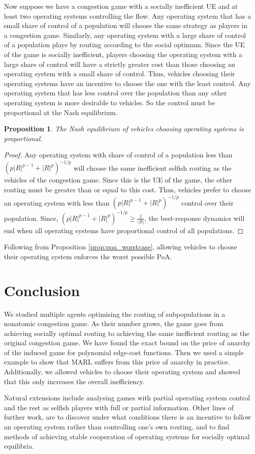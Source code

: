 \documentclass{article}
\newtheorem{prop}{Proposition}
\begin{document}
    Now suppose we have a congestion game with a socially inefficient UE and at least two operating systems controlling the flow. Any operating system that has a small share of control of a population will choose the same strategy as players in a congestion game. Similarly, any operating system with a large share of control of a population plays by routing according to the social optimum. Since the UE of the game is socially inefficient, players choosing the operating system with a large share of control will have a strictly greater cost than those choosing an operating system with a small share of control. Thus, vehicles choosing their operating systems have an incentive to choose the one with the least control. 
    Any operating system that has less control over the population than any other operating system is more desirable to vehicles. So the control must be proportional at the Nash equilibrium.
    \begin{prop}
    The Nash equilibrium of vehicles choosing operating systems is proportional. 
    \end{prop}
    \begin{proof} 
    Any operating system with share of control of a population less than $(p|R|^{p-1}+|R|^p)^{-1/p}$ will choose the same inefficient selfish routing as the vehicles of the congestion game. Since this is the UE of the game, the other routing must be greater than or equal to this cost. Thus, vehicles prefer to choose an operating system with less than $(p|R|^{p-1}+|R|^p)^{-1/p}$ control over their population.  Since, $(p|R|^{p-1}+|R|^p)^{-1/p}\geq \frac{1}{|R|}$, the best-response dynamics will end when all operating systems have proportional control of all populations.
    \end{proof}
    
    Following from Proposition \ref{prop:poa_worstcase}, allowing vehicles to choose their operating system enforces the worst possible PoA. %
    

\section{Conclusion}
  We studied multiple agents optimising the routing of subpopulations in a nonatomic congestion game. As their number grows, the game goes from achieving socially optimal routing to achieving the same inefficient routing as the original congestion game. We have found the exact bound on the price of anarchy of the induced game for polynomial edge-cost functions. Then we used a simple example to show that MARL suffers from this price of anarchy in practice. Additionally, we allowed vehicles to choose their operating system and showed that this only increases the overall inefficiency.
  
  Natural extensions include analysing games with partial operating system control and the rest as selfish players with full or partial information. Other lines of further work, are to discover under what conditions there is an incentive to follow an operating system rather than controlling one's own routing, and to find methods of achieving stable cooperation of operating systems for socially optimal equilibria.




\end{document}
